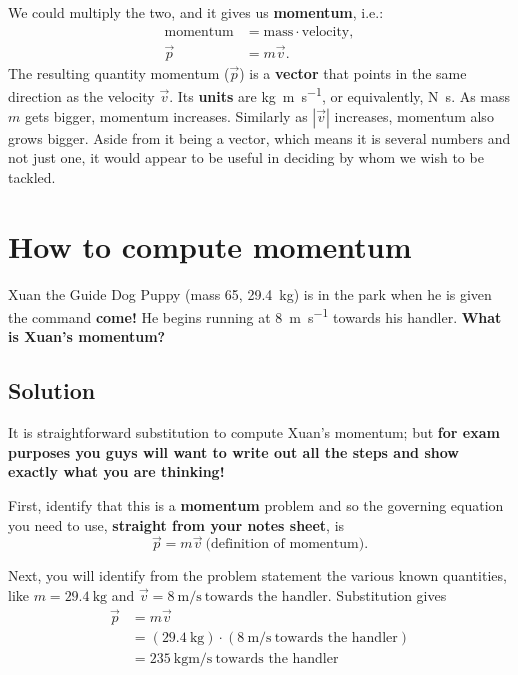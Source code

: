 \documentclass[handout]{tufte-handout}
\begin{document}
We could multiply the two, and it gives us \textbf{momentum}, i.e.: 
\begin{align}
\text{momentum} &= \text{mass} \cdot \text{velocity}, \\
\vec{p} &= m \vec{v}.
\end{align}
The resulting quantity momentum ($\vec{p}$) is a \textbf{vector} that points in the same direction as the velocity $\vec{v}$. Its \textbf{units} are \si{\kilo\gram\meter\per\second}, or equivalently, \si{\newton\second}. As mass $m$ gets bigger, momentum increases. Similarly as $|\vec{v}|$ increases, momentum also grows bigger. Aside from it being a vector, which means it is several numbers and not just one, it would appear to be useful in deciding by whom we wish to be tackled.

\section{How to compute momentum}
Xuan the Guide Dog Puppy (mass \SI{65}{\pound}, \SI{29.4}{\kilo\gram}) is in the park when he is given the command \textbf{come!} He begins running at \SI{8}{\meter\per\second} towards his handler. \textbf{What is Xuan's momentum?}

\subsection{Solution}
It is straightforward substitution to compute Xuan's momentum; but \textbf{for exam purposes you guys will want to write out all the steps and show exactly what you are thinking!}

First, identify that this is a \textbf{momentum} problem and so the governing equation you need to use, \textbf{straight from your notes sheet}, is
\begin{equation}
\vec{p} = m \vec{v}\ \text{(definition of momentum)}.
\end{equation}

Next, you will identify from the problem statement the various known quantities, like $m=\SI{29.4}{\kilo\gram}$ and $\vec{v} = \SI{8}{\meter\per\second}\ \text{towards the handler}$. Substitution gives
\begin{align}
\vec{p} &= m \vec{v}\\
&= (\SI{29.4}{\kilo\gram})\cdot(\SI{8}{\meter\per\second}\ \text{towards the handler}) \\
&= \SI{235}{\kilo\gram\meter\per\second}\ \text{towards the handler}
\end{align}
\end{document}
